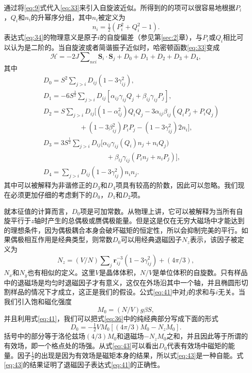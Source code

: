 \documentclass{article}
\begin{document}
通过将\eqref{eq:9}式代入\eqref{eq:33}来引入自旋波近似。所得到的的项可以很容易地根据$P_i$，$Q_i$和$n_i$的升幂序分组，其中$n_i$被定义为
\begin{equation} \label{eq:34}
n_i=\tfrac{1}{2}(P_i^2+Q_i^2-1).
\end{equation}
表达式\eqref{eq:34}的物理意义是原子$i$的自旋偏差（参见第\ref{sec:2}章），与$P_i$或$Q_i$相比可以认为是二阶的。当自旋波或者简谐振子近似时，哈密顿函数\eqref{eq:33}变成
\begin{equation} \label{eq:35}
\mathcal{H}=-2J\sum\nolimits_{\mathit{nei}}\mathbf{S}_i\cdot\mathbf{S}_j+D_0+D_1+D_2+D_3+D_4,
\end{equation}
其中
\begin{eqnarray}
&&D_0=S^2\sum\nolimits_{j>i}D_{ij}(1-3\gamma_{ij}^2),\label{eq:36}\\
&&D_1=-6S^{\frac{3}{2}}\sum\nolimits_{j>i}D_{ij}[\alpha_{ij}\gamma_{ij}Q_j+\beta_{ij}\gamma_{ij}P_j],\label{eq:37}\\
&&D_2=S\sum\nolimits_{j>i}D_{ij}[(1-\alpha_{ij}^2)Q_iQ_j-3\alpha_{ij}\beta_{ij}(Q_iP_j+P_iQ_j)\nonumber\\
&&\phantom{~~~~~~~~~~~~~~~~~~~~~~~~}+(1-3\beta_{ij}^2)P_iP_j-(1-3\gamma_{ij}^2)2n_i],\label{eq:38}\\
&&D_3=3S^{\frac{1}{2}}\sum\nolimits_{j>i}D_{ij}[\alpha_{ij}\gamma_{ij}(Q_i)n_j+n_iQ_j)\nonumber\\
&&\phantom{~~~~~~~~~~~~~~~~~~~~~~~~~~~~~~~~~~~~~~~~~~}+\beta_{ij}\gamma_{ij}(P_in_j+n_iP_j)], \label{eq:39}\\
&&D_4=\sum\nolimits_{j>i}D_{ij}(1-3\gamma_{ij}^2)n_in_j.\label{eq:40}
\end{eqnarray}
其中可以被解释为非谐修正的$D_3$和$D_4$项具有较高的阶数，因此可以忽略。我们现在必须更加仔细的考虑剩下的$D_0$，$D_1$和$D_2$项。

就本征值的计算而言，$D_0$项是可加常数。从物理上讲，它可以被解释为当所有自旋平行于$z$轴时产生的总偶极或赝偶极能量。但是这是仅在无穷大磁场中才能达到的理想条件，因为偶极耦合本身会破坏磁矩的恒定性，所以会抑制完美的平行。如果偶极相互作用是经典类型，则常数$D_0$可以用经典退磁因子$N_z$表示，该因子被定义为
\begin{equation} \label{eq:41}
N_z=(V/N)\sum\nolimits_j\boldsymbol{r}_{ij}^{-3}(1-3\gamma_{ij}^2)+(4\pi/3)
,\end{equation}
$N_x$和$N_y$也有相似的定义。这里$V$是晶体体积，$N/V$是单位体积的自旋数。只有样品中的退磁场是均匀时退磁因子才有意义，这仅在外场沿其中一个轴，并且椭圆形切割样品的情况下才成立，这正是我们的假设。公式\eqref{eq:41}中对$j$的求和与$i$无关。当我们引入饱和磁化强度
\begin{equation} \label{eq:42}
M_0=(N/V)g\beta S,
\end{equation}
并且利用式\eqref{eq:41}，我们可以把式\eqref{eq:36}中的纯经典部分写成下面的形式
\begin{equation} \label{eq:43}
D_0=-\tfrac{1}{2}VM_0[(4\pi/3)M_0-N_zM_0].
\end{equation}
括号中的部分等于洛伦兹场$(4/3)M_0$和退磁场$-N_zM_0$之和，并且因此等于所谓的有效场，即一个格点处的场强。从式\eqref{eq:43}可以看出$D_0$代表有效场中磁矩的能量。因子$\tfrac{1}{2}$的出现是因为有效场是磁矩本身的结果，所以式\eqref{eq:43}是一种自能。式\eqref{eq:43}的结果证明了退磁因子表达式\eqref{eq:41}的正确性。
\end{document}
